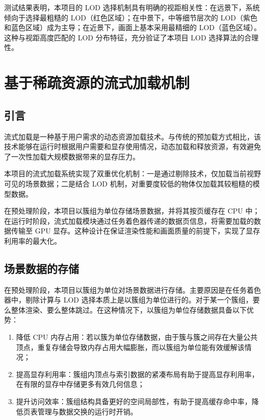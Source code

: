测试结果表明，本项目的 LOD 选择机制具有明确的视距相关性：在远景下，系统倾向于选择最粗糙的 LOD（红色区域）；在中景下，中等细节层次的 LOD（紫色和蓝色区域）成为主导；在近景下，画面上基本采用最精细的 LOD（蓝色区域）。这种与视距高度匹配的 LOD 分布特征，充分验证了本项目 LOD 选择算法的合理性。

\clearpage

\section{基于稀疏资源的流式加载机制} \label{sec:streaming}

\subsection{引言}

流式加载是一种基于用户需求的动态资源加载技术。与传统的预加载方式相比，该技术能够在运行时根据用户需要和显存使用情况，动态加载和释放资源，有效避免了一次性加载大规模数据带来的显存压力\cite{sahm2004}。

本项目的流式加载系统实现了双重优化机制：一是通过剔除技术，仅加载当前视野可见的场景数据\cite{CohenOr2003}；二是结合 LOD 机制，对重要度较低的物体仅加载其较粗糙的模型数据。

在预处理阶段，本项目以簇组为单位存储场景数据，并将其按页缓存在 CPU 中；在运行时阶段，流式加载模块通过任务着色器传递的数据页信息，将需要加载的数据传输至 GPU 显存。这种设计在保证渲染性能和画面质量的前提下，实现了显存利用率的最大化。

\subsection{场景数据的存储}

在预处理阶段，本项目以簇组为单位对场景数据进行存储。主要原因是在任务着色器中，剔除计算与 LOD 选择本质上是以簇组为单位进行的。对于某一个簇组，要么整体渲染、要么整体跳过。在这种情况下，以簇组为单位存储数据具备以下优势：

\begin{enumerate}
    \item 降低 CPU 内存占用：若以簇为单位存储数据，由于簇与簇之间存在大量公共顶点，重复存储会导致内存占用大幅膨胀，而以簇组为单位能有效缓解该情况；
    \item 提高显存利用率：簇组内顶点与索引数据的紧凑布局有助于提高显存利用率，在有限的显存中存储更多有效几何信息；
    \item 提升访问效率：簇组结构具备更好的空间局部性\cite{MCCOOL2012}，有助于提高缓存命中率，降低页表管理与数据交换的运行时开销。
\end{enumerate}

